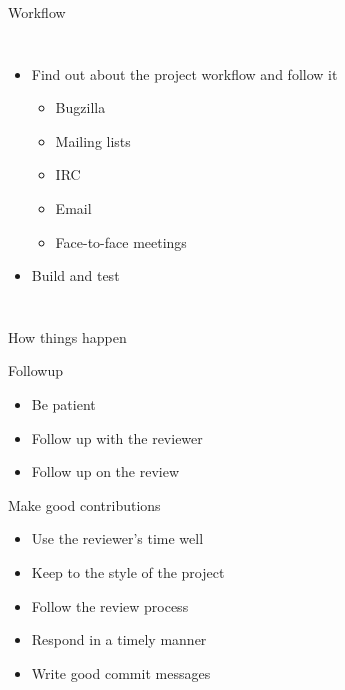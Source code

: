 \documentclass{beamer}
\begin{document}
\begin{frame}{Workflow}
  \begin{columns}
    \begin{itemize}
    \item
      Find out about the project workflow and follow it
      \begin{itemize}
      \item
        \alert<2>{Bugzilla}
      \item
        \alert<3>{Mailing lists}
      \item
        \alert<4>{IRC}
      \item
        \alert<5>{Email}
      \item
        \alert<6-6>{Face-to-face meetings}
      \end{itemize}
    \item
      Build and test
    \end{itemize}
  \end{columns}
\end{frame}

\begin{frame}{How things happen}
\end{frame}

\begin{frame}{Followup}
  \begin{itemize}
  \item
    Be patient
  \item
    Follow up with the reviewer
  \item
    Follow up on the review
  \end{itemize}
\end{frame}

\begin{frame}{Make good contributions}
  \begin{itemize}
  \item
    Use the reviewer's time well
  \item
    Keep to the style of the project
  \item
    Follow the review process
  \item
    Respond in a timely manner
  \item
    Write good commit messages
  \end{itemize}
\end{frame}
\end{document}
